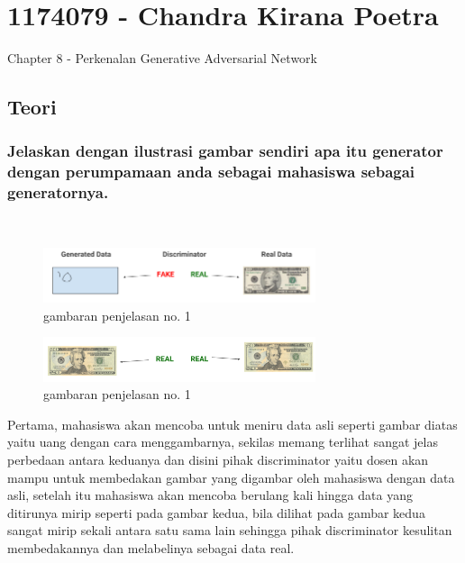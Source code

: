 \section{1174079 - Chandra Kirana Poetra}
Chapter 8 - Perkenalan Generative Adversarial Network
\subsection{Teori}
\subsubsection{Jelaskan dengan ilustrasi gambar sendiri apa itu generator dengan perumpamaan anda sebagai mahasiswa sebagai generatornya.}
\hfill\\
\begin{figure}[H]
	\centering
	\includegraphics[width=8cm]{figures/1174079/8/gan_diagram.png}
	\caption{gambaran penjelasan no. 1}
\end{figure}
\begin{figure}[H]
	\centering
	\includegraphics[width=8cm]{figures/1174079/8/gan_diagram2.png}
	\caption{gambaran penjelasan no. 1}
\end{figure}
Pertama, mahasiswa akan mencoba untuk meniru data asli seperti gambar diatas yaitu uang dengan cara menggambarnya, sekilas memang terlihat sangat jelas perbedaan antara keduanya dan disini pihak discriminator yaitu dosen akan mampu untuk membedakan gambar yang digambar oleh mahasiswa dengan data asli, setelah itu mahasiswa akan mencoba berulang kali hingga data yang ditirunya mirip seperti pada gambar kedua, bila dilihat pada gambar kedua sangat mirip sekali antara satu sama lain sehingga pihak discriminator kesulitan membedakannya dan melabelinya sebagai data real.

